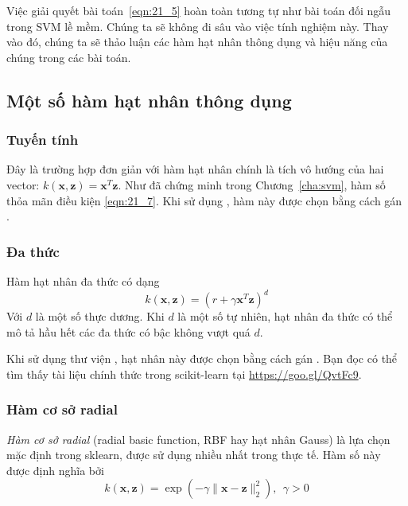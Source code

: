 Việc giải quyết bài toán~\eqref{eqn:21_5} hoàn toàn tương tự như bài toán
đối ngẫu trong SVM lề mềm. Chúng ta sẽ không đi sâu vào việc tính nghiệm này. Thay
vào đó, chúng ta sẽ thảo luận các hàm hạt nhân thông dụng và hiệu năng của chúng trong các bài toán.

\subsection{Một số hàm hạt nhân thông dụng}
\subsubsection{Tuyến tính}
Đây là trường hợp đơn giản với hàm hạt nhân chính là tích vô hướng của hai vector:
$k(\mathbf{x}, \mathbf{z}) = \mathbf{x}^T\mathbf{z}$.
Như đã chứng minh trong Chương~\ref{cha:svm}, hàm số thỏa mãn điều kiện \eqref{eqn:21_7}. Khi sử dụng , hàm này được chọn bằng cách gán
.


\subsubsection{Đa thức}
Hàm hạt nhân đa thức có dạng
\begin{equation}
k(\mathbf{x}, \mathbf{z}) = (r + \gamma \mathbf{x}^T\mathbf{z})^d
\end{equation}
Với $d$ là một số thực dương. Khi $d$ là một số tự nhiên, hạt nhân đa thức có thể mô tả hầu hết các đa thức có bậc không
vượt quá $d$.

Khi sử dụng thư viện , hạt nhân này được chọn bằng cách gán
. Bạn đọc có thể tìm thấy tài liệu
chính thức trong scikit-learn tại \url{https://goo.gl/QvtFc9}.

\subsubsection{Hàm cơ sở radial}
\textit{Hàm cơ sở radial} (radial basic function, RBF hay hạt nhân Gauss) là lựa chọn mặc định trong sklearn, được sử dụng nhiều nhất trong thực tế. Hàm số này được định nghĩa bởi
\begin{equation}
k(\mathbf{x}, \mathbf{z}) = \exp(-\gamma \|\mathbf{x} - \mathbf{z}\|_2^2), ~~ \gamma > 0
\end{equation}

